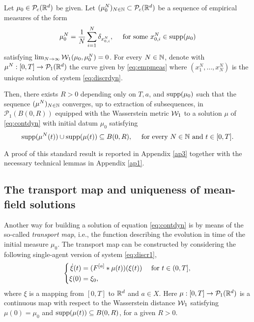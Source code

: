 
\begin{proposition}\label{pr:exist}
Let $\mu_0 \in \mathcal{P}_c(\mathbb{R}^d)$ be given. Let $(\mu^{N}_0)_{N \in \mathbb{N}} \subset \mathcal{P}_c(\mathbb{R}^d)$ be a sequence of empirical measures of the form
\begin{align*}
\mu^{N}_0 = \frac{1}{N}\sum^N_{i = 1} \delta_{x^{N}_{0,i}}, \quad \text{ for some } x^{N}_{0,i} \in \operatorname{supp}(\mu_0)
\end{align*}
satisfying $\lim_{N \rightarrow \infty} \mathcal{W}_1(\mu_0,\mu^{N}_0) = 0$. For every $N \in \mathbb{N}$, denote with $\mu^N:[0,T] \rightarrow \mathcal{P}_1(\mathbb{R}^{d})$ the curve given by \eqref{eq:empmeas} where $(x^N_1,\ldots,x^N_N)$ is the unique solution of system \eqref{eq:discrdyn}.

Then, there exists $R > 0$ depending only on $T,a$, and $\operatorname{supp}(\mu_0)$ such that the sequence $(\mu^N)_{N \in \mathbb{N}}$ converges, up to extraction of subsequences, in $\mathcal{P}_1(B(0,R))$ equipped with the Wasserstein metric $\mathcal{W}_1$ to a solution $\mu$ of \eqref{eq:contdyn} with initial datum $\mu_0$ satisfying
\begin{align*}
\operatorname{supp}(\mu^N(t)) \cup \operatorname{supp}(\mu(t)) \subseteq B(0,R), \quad \text{ for every } N \in \mathbb{N} \text{ and } t \in [0,T].
\end{align*}
\end{proposition}

 A proof of this standard result is reported in Appendix \ref{ap3} together with the necessary technical lemmas in Appendix \ref{ap1}.

\subsection{The transport map and  uniqueness of mean-field solutions}

Another way for building a solution of equation \eqref{eq:contdyn} is by means of the so-called \textit{transport map}, i.e., the function describing the evolution in time of the initial measure $\mu_0$. The transport map can be constructed by considering the following single-agent version of system \eqref{eq:discr1},
\begin{align}\label{eq:transpdyn}
\left\{\begin{aligned}
\dot{\xi}(t) &= (F^{[a]}*\mu(t))(\xi(t)) \quad \text{ for } t \in (0,T],\\
\xi(0) &= \xi_0,
\end{aligned}\right.
\end{align}
where $\xi$ is a mapping from $[0,T]$ to $\mathbb{R}^d$ and $a \in X$. Here $\mu:[0,T]\rightarrow\mathcal{P}_1(\mathbb{R}^d)$ is a continuous map with respect to the Wasserstein distance $\mathcal{W}_1$ satisfying $\mu(0) = \mu_0$ and $\operatorname{supp}(\mu(t)) \subseteq B(0,R)$, for a given $R>0$.%

